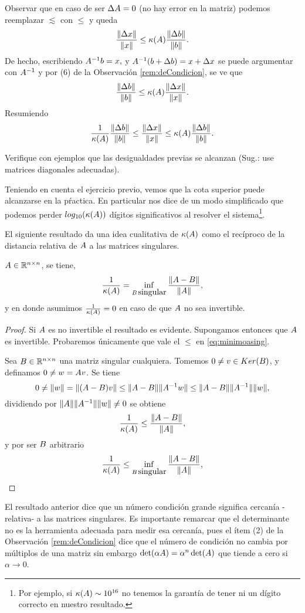 Observar que en caso de ser $\Delta \Ab=\cero$ (no hay error en la matriz) podemos reemplazar $\lesssim$ con $\le$ y queda
$$\frac{\|\Delta \xb\|}{\|\xb\|}\le \kappa(\Ab)\frac{\|\Delta \bb\|}{\|\bb\|}.$$
De hecho, escribiendo
$\Ab^{-1}\bb=\xb,$ y $\Ab^{-1}(\bb+\Delta\bb)=\xb+\Delta \xb$ se puede argumentar con $\Ab^{-1}$ y por (6) de la Observación \ref{rem:deCondicion}, se ve que
$$\frac{\|\Delta \bb\|}{\|\bb\|}\le \kappa(\Ab)\frac{\|\Delta \xb\|}{\|\xb\|}.$$
Resumiendo
\tcc
$$\frac{1}{\kappa(\Ab)}\frac{\|\Delta \bb\|}{\|\bb\|}\le \frac{\|\Delta \xb\|}{\|\xb\|}\le \kappa(\Ab)\frac{\|\Delta \bb\|}{\|\bb\|}.$$
\etcc
\begin{ej}
 Verifique con ejemplos que las desigualdades previas se alcanzan (Sug.: use matrices diagonales adecuadas).
\end{ej}
Teniendo en cuenta el ejercicio previo, vemos que la cota superior puede alcanzarse en la pŕactica. En particular nos dice de un modo simplificado que podemos perder $log_{10}(\kappa(\Ab))$ dígitos significativos al resolver el sistema\footnote{Por ejemplo, si $\kappa(\Ab)\sim 10^{16}$ no tenemos la garantía de tener ni un dígito correcto en nuestro resultado.}.

El siguiente resultado da una idea cualitativa de $\kappa(\Ab)$ como el recíproco de la distancia relativa de $\Ab$ a las matrices singulares.
\begin{teo}
 $\Ab\in \Rnn$, se tiene,
 \begin{equation}
 \label{eq:minimoasing}
\frac{1}{\kappa(\Ab)}=\inf_{\Bb\,  \mbox{singular}} \frac{\|\Ab-\Bb\|}{\|\Ab\|},
 \end{equation}
 y en donde asumimos $\frac{1}{\kappa(\Ab)}=0$ en caso de que $\Ab$ no sea invertible.
 \end{teo}
 \begin{proof}
  Si $\Ab$ es no invertible el resultado es evidente. Supongamos entonces que $\Ab$ es invertible. Probaremos únicamente que vale  el $\le$  en \eqref{eq:minimoasing}.

  Sea $B\in \mathbb R^{n\times n}$ una matriz singular cualquiera. Tomemos $\cero\neq \vb\in Ker(\Bb)$, y definamos $\cero\neq\wb=\Ab\vb$. Se tiene
  $$
  0\neq \|\wb\|=\|(\Ab - \Bb)\vb\|\le \|\Ab-\Bb\|\|\Ab^{-1}\wb\|\le \|\Ab-\Bb\|\|\Ab^{-1}\|\|\wb\|,
  $$
  dividiendo por $\|\Ab\|\|\Ab^{-1}\|\|\wb\|\neq 0$ se obtiene
  $$
\frac{1}{\kappa(\Ab)}\le  \frac{\|\Ab-\Bb\|}{\|\Ab\|},
 $$
 y por ser $\Bb$ arbitrario
 $$
\frac{1}{\kappa(\Ab)}\le \inf_{\Bb\,  \mbox{singular}} \frac{\|\Ab-\Bb\|}{\|\Ab\|},
 $$
 \end{proof}
El resultado anterior dice que un número condición grande significa cercanía -relativa- a las matrices singulares. Es importante remarcar que el determinante  no es la herramienta adecuada para medir esa cercanía, pues el ítem (2) de la Observación \ref{rem:deCondicion} dice que el número de condición no cambia por múltiplos de una matriz sin embargo $\det(\alpha\Ab)=\alpha^n\det(\Ab)$ que tiende a cero si $\alpha\to 0$.
